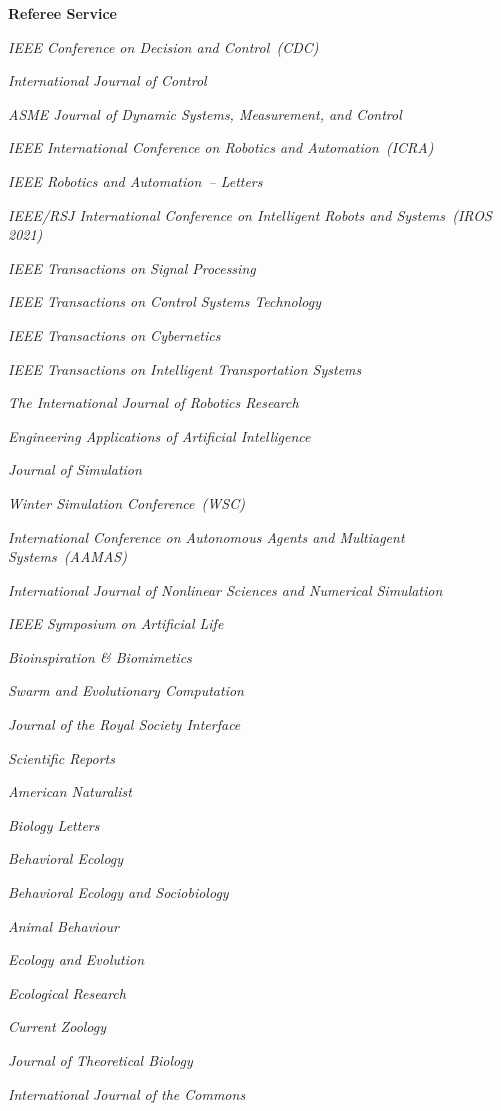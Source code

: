 \documentclass[10pt]{article}           %
\begin{document}
\textbf{Referee Service}
\begin{cvlist}
    \item \emph{IEEE Conference on Decision and Control~(CDC)}
    \item \emph{International Journal of Control}
    \item \emph{ASME Journal of Dynamic Systems, Measurement, and Control}
    \item \emph{IEEE International Conference on Robotics and Automation~(ICRA)}
    \item \emph{IEEE Robotics and Automation~-- Letters}
    \item \emph{IEEE/RSJ International Conference on Intelligent Robots and Systems~(IROS 2021)}
    \item \emph{IEEE Transactions on Signal Processing}
    \item \emph{IEEE Transactions on Control Systems Technology}
    \item \emph{IEEE Transactions on Cybernetics}
    \item \emph{IEEE Transactions on Intelligent Transportation Systems}
    \item \emph{The International Journal of Robotics Research}
    \item \emph{Engineering Applications of Artificial Intelligence}
    \item \emph{Journal of Simulation}
    \item \emph{Winter Simulation Conference~(WSC)}
    \item \emph{International Conference on Autonomous Agents and Multiagent Systems~(AAMAS)}
    \item \emph{International Journal of Nonlinear Sciences and Numerical Simulation}
    \item \emph{IEEE Symposium on Artificial Life}
    \item \emph{Bioinspiration \& Biomimetics}
    \item \emph{Swarm and Evolutionary Computation}
    \item \emph{Journal of the Royal Society Interface}
    \item \emph{Scientific Reports}
    \item \emph{American Naturalist}
    \item \emph{Biology Letters}
    \item \emph{Behavioral Ecology}
    \item \emph{Behavioral Ecology and Sociobiology}
    \item \emph{Animal Behaviour}
    \item \emph{Ecology and Evolution}
    \item \emph{Ecological Research}
    \item \emph{Current Zoology}
    \item \emph{Journal of Theoretical Biology}
    \item \emph{International Journal of the Commons}
\end{cvlist}
\end{document}
